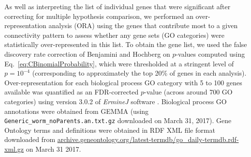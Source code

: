 \documentclass[10pt,letterpaper]{article}
\begin{document}
As well as interpreting the list of individual genes that were significant after correcting for multiple hypothesis comparison, we performed an over-representation analysis (ORA) using the genes that contribute most to a given connectivity pattern to assess whether any gene sets (GO categories) were statistically over-represented in this list.
To obtain the gene list, we used the false discovery rate correction of Benjamini and Hochberg \cite{Benjamini:1995cd} on $p$-values computed using Eq.~\eqref{eq:CBinomialProbability}, which were thresholded at a stringent level of $p = 10^{-4}$ (corresponding to approximately the top 20\% of genes in each analysis).
Over-representation for each biological process GO category with 5 to 100 genes available was quantified as an FDR-corrected $p$-value (across around 700 GO categories) using version 3.0.2 of \emph{ErmineJ} software \cite{Gillis2010}.
Biological process GO annotations \cite{Ashburner2000} were obtained from GEMMA \cite{Zoubarev2012} (using \texttt{Generic\_worm\_noParents.an.txt.gz} downloaded on March 31, 2017).
Gene Ontology terms and definitions were obtained in RDF XML file format downloaded from \url{archive.geneontology.org/latest-termdb/go_daily-termdb.rdf-xml.gz} on March 31 2017.

\end{document}
